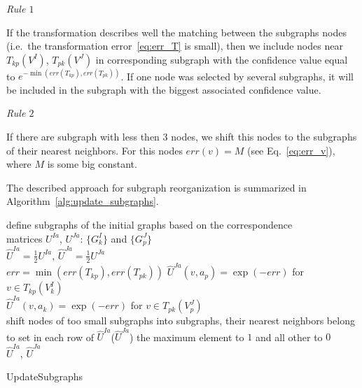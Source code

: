 \textit{Rule $1$}

If the transformation describes well the matching between the subgraphs nodes (i.e.\ the transformation error~\ref{eq:err_T} is small), then we include nodes near $T_{kp}(V^I)$, $T_{pk}(V^J)$ in corresponding subgraph with the confidence value equal to $e^{-\min(err(T_{kp}), err(T_{pk}))}$. If one node was selected by several subgraphs, it will be included in the subgraph with the biggest associated confidence value.

\textit{Rule $2$}

If there are subgraph with less then $3$ nodes, we shift this nodes to the subgraphs of their nearest neighbors. For this nodes $err(v)=M$ (see Eq.~\ref{eq:err_v}), where $M$ is some big constant. 

The described approach for subgraph reorganization is summarized in Algorithm~\ref{alg:update_subgraphs}.

\vspace{20pt}
\begin{algorithm}[H]
	\nl define subgraphs of the initial graphs based on the correspondence \\
	matrices $U^{Ia}$, $U^{Ja}$: $\{G^I_k\}$ and  $\{G^J_p\}$ \\
	\nl $\hat{U}^{Ia} = \frac{1}{2}U^{Ia}$, $\hat{U}^{Ja} = \frac{1}{2}U^{Ja}$ \\
	\nl {}
			{
				{ 
			      $err = \min(err(T_{kp}), err(T_{pk}))$ 
			         {
			          $\hat{U}^{Ja}(v, a_p) = \exp(-err)$ for $v\in T_{kp}(V^{I}_k)$ \\
   		 	          $\hat{U}^{Ia}(v, a_k) = \exp(-err)$ for $v\in T_{pk}(V^{J}_p)$ \\
   		 	         }
   		 	    }
    		 	{shift nodes of too small subgraphs into subgraphs, their nearest neighbors belong to} 
		    }			
	\nl  set in each row of  $\hat{U}^{Ia}$($\hat{U}^{Ja}$) the maximum element to $1$ and all other to $0$\\
	\Return $\hat{U}^{Ia}$, $\hat{U}^{Ja}$
	
	\caption{UpdateSubgraphs}    \label{alg:update_subgraphs}
\end{algorithm}

